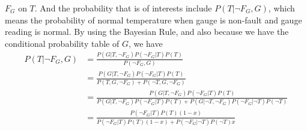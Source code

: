 \documentclass{article}
\begin{document}
\begin{enumerate}[a.]
{    $F_G$ on $T$. And the probability that is of interests include
    $P(T|\neg F_G,G)$, which means the probability of normal
    temperature when gauge is non-fault and gauge reading is normal. 
    By using the Bayesian Rule, and also because we have the
    conditional probability table of $G$, we have 
    \begin{align*}
      P(T|\neg F_G,G) 
      & =\frac{P(G|T,\neg F_G)P(\neg F_G|T)P(T)}{P(\neg F_G, G)} \\
      & =\frac{P(G|T,\neg F_G)P(\neg F_G|T)P(T)}{P(T,G,\neg
        F_G)+P(\neg T,G,\neg F_G)} \\
      & =\frac{P(G|T,\neg F_G)P(\neg F_G|T)P(T)}{P(G|T,\neg F_G)P(\neg
        F_G|T)P(T) + P(G|\neg T,\neg F_G)P(\neg F_G|\neg T)P(\neg T)} \\
      & =\frac{P(\neg F_G|T)P(T)(1-x)}{P(\neg F_G|T)P(T)(1-x)+P(\neg
        F_G|\neg T)P(\neg T)x}
    \end{align*}
  }
\end{enumerate}
\end{document}

